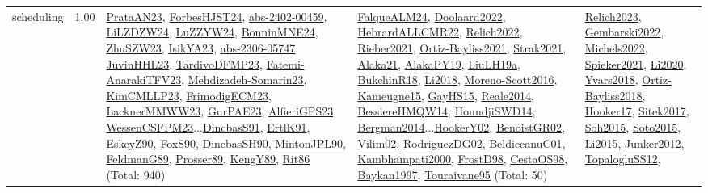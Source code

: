 {\begin{longtable}{p{3cm}r>{\raggedright\arraybackslash}p{6cm}>{\raggedright\arraybackslash}p{6cm}>{\raggedright\arraybackslash}p{8cm}}
\index{scheduling}\index{Scheduling!scheduling}scheduling &  1.00 & \hyperref[detail:PrataAN23]{PrataAN23}, \hyperref[detail:ForbesHJST24]{ForbesHJST24}, \hyperref[detail:abs-2402-00459]{abs-2402-00459}, \hyperref[detail:LiLZDZW24]{LiLZDZW24}, \hyperref[detail:LuZZYW24]{LuZZYW24}, \hyperref[detail:BonninMNE24]{BonninMNE24}, \hyperref[detail:ZhuSZW23]{ZhuSZW23}, \hyperref[detail:IsikYA23]{IsikYA23}, \hyperref[detail:abs-2306-05747]{abs-2306-05747}, \hyperref[detail:JuvinHHL23]{JuvinHHL23}, \hyperref[detail:TardivoDFMP23]{TardivoDFMP23}, \hyperref[detail:Fatemi-AnarakiTFV23]{Fatemi-AnarakiTFV23}, \hyperref[detail:Mehdizadeh-Somarin23]{Mehdizadeh-Somarin23}, \hyperref[detail:KimCMLLP23]{KimCMLLP23}, \hyperref[detail:FrimodigECM23]{FrimodigECM23}, \hyperref[detail:LacknerMMWW23]{LacknerMMWW23}, \hyperref[detail:GurPAE23]{GurPAE23}, \hyperref[detail:AlfieriGPS23]{AlfieriGPS23}, \hyperref[detail:WessenCSFPM23]{WessenCSFPM23}...\hyperref[detail:DincbasS91]{DincbasS91}, \hyperref[detail:ErtlK91]{ErtlK91}, \hyperref[detail:EskeyZ90]{EskeyZ90}, \hyperref[detail:FoxS90]{FoxS90}, \hyperref[detail:DincbasSH90]{DincbasSH90}, \hyperref[detail:MintonJPL90]{MintonJPL90}, \hyperref[detail:FeldmanG89]{FeldmanG89}, \hyperref[detail:Prosser89]{Prosser89}, \hyperref[detail:KengY89]{KengY89}, \hyperref[detail:Rit86]{Rit86} (Total: 940) & \hyperref[detail:FalqueALM24]{FalqueALM24}, \hyperref[detail:Doolaard2022]{Doolaard2022}, \hyperref[detail:HebrardALLCMR22]{HebrardALLCMR22}, \hyperref[detail:Relich2022]{Relich2022}, \hyperref[detail:Rieber2021]{Rieber2021}, \hyperref[detail:Ortiz-Bayliss2021]{Ortiz-Bayliss2021}, \hyperref[detail:Strak2021]{Strak2021}, \hyperref[detail:Alaka21]{Alaka21}, \hyperref[detail:AlakaPY19]{AlakaPY19}, \hyperref[detail:LiuLH19a]{LiuLH19a}, \hyperref[detail:BukchinR18]{BukchinR18}, \hyperref[detail:Li2018]{Li2018}, \hyperref[detail:Moreno-Scott2016]{Moreno-Scott2016}, \hyperref[detail:Kameugne15]{Kameugne15}, \hyperref[detail:GayHS15]{GayHS15}, \hyperref[detail:Reale2014]{Reale2014}, \hyperref[detail:BessiereHMQW14]{BessiereHMQW14}, \hyperref[detail:HoundjiSWD14]{HoundjiSWD14}, \hyperref[detail:Bergman2014]{Bergman2014}...\hyperref[detail:HookerY02]{HookerY02}, \hyperref[detail:BenoistGR02]{BenoistGR02}, \hyperref[detail:Vilim02]{Vilim02}, \hyperref[detail:RodriguezDG02]{RodriguezDG02}, \hyperref[detail:BeldiceanuC01]{BeldiceanuC01}, \hyperref[detail:Kambhampati2000]{Kambhampati2000}, \hyperref[detail:FrostD98]{FrostD98}, \hyperref[detail:CestaOS98]{CestaOS98}, \hyperref[detail:Baykan1997]{Baykan1997}, \hyperref[detail:Touraivane95]{Touraivane95} (Total: 50) & \hyperref[detail:Relich2023]{Relich2023}, \hyperref[detail:Gembarski2022]{Gembarski2022}, \hyperref[detail:Michels2022]{Michels2022}, \hyperref[detail:Spieker2021]{Spieker2021}, \hyperref[detail:Li2020]{Li2020}, \hyperref[detail:Yvars2018]{Yvars2018}, \hyperref[detail:Ortiz-Bayliss2018]{Ortiz-Bayliss2018}, \hyperref[detail:Hooker17]{Hooker17}, \hyperref[detail:Sitek2017]{Sitek2017}, \hyperref[detail:Soh2015]{Soh2015}, \hyperref[detail:Soto2015]{Soto2015}, \hyperref[detail:Li2015]{Li2015}, \hyperref[detail:Junker2012]{Junker2012}, \hyperref[detail:TopalogluSS12]{TopalogluSS12}, 
\end{longtable}}
